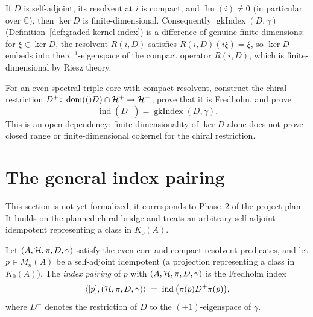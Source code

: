 \begin{theorem}
  \label{thm:finiteDimensional-Dkernel}
  \leanok
  If $D$ is self-adjoint, its resolvent at $i$ is compact, and
  $\operatorname{Im}(i)\neq 0$ (in particular over $\mathbb C$), then $\ker D$ is
  finite-dimensional.
  Consequently $\operatorname{gkIndex}(D, \gamma)$
  (Definition~\ref{def:graded-kernel-index}) is a difference of genuine finite dimensions:
  for $\xi \in \ker D$, the resolvent $R(i, D)$
  satisfies $R(i,D)(i\xi) = \xi$, so $\ker D$ embeds into the $i^{-1}$-eigenspace of the
  compact operator $R(i, D)$, which is finite-dimensional by Riesz theory.
\end{theorem}

\begin{theorem}
  \label{thm:chiral-fredholm-bridge}
  For an even spectral-triple core with compact resolvent, construct the chiral restriction
  $D^+\colon \operatorname{dom}(()D)\cap\mathcal{H}^+\to\mathcal{H}^-$, prove that it is Fredholm, and prove
  \[
    \operatorname{ind}(D^+) = \operatorname{gkIndex}(D,\gamma).
  \]
  This is an open dependency: finite-dimensionality of $\ker D$ alone does not prove closed
  range or finite-dimensional cokernel for the chiral restriction.
\end{theorem}

\section{The general index pairing}
\label{sec:general-index-pairing}

This section is not yet formalized; it corresponds to Phase~2 of the project plan.  It builds
on the planned chiral bridge and treats an arbitrary self-adjoint idempotent representing a
class in $K_0(A)$.

\begin{definition}
  \label{def:index-pairing}
  Let $(A, \mathcal{H}, \pi, D, \gamma)$ satisfy the even core and compact-resolvent predicates, and let
  $p \in M_n(A)$ be a self-adjoint idempotent (a projection representing a class
  in $K_0(A)$). The \emph{index pairing} of $p$ with $(A, \mathcal{H}, \pi, D, \gamma)$ is
  the Fredholm index
  \[
    \langle [p], (\mathcal{H}, \pi, D, \gamma) \rangle
      \;=\; \operatorname{ind}\big( \pi(p) D^{+} \pi(p) \big),
  \]
  where $D^{+}$ denotes the restriction of $D$ to the $(+1)$-eigenspace of $\gamma$.
\end{definition}

